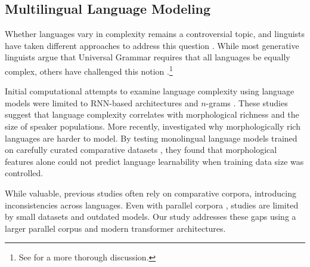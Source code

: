 \subsection{Multilingual Language Modeling}

Whether languages vary in complexity remains a controversial topic, and linguists have taken different approaches to address this question \citep[e.g.,][]{mcwhorter2001worlds,mcwhorter2011linguistic,newmeyer2021complexity,joseph2012all}. While most generative linguists argue that Universal Grammar requires that all languages be equally complex, others have challenged this notion \citep{gil2008complex}.\footnote{See \citet{newmeyer2021complexity} for a more thorough discussion.}

Initial computational attempts to examine language complexity using language models were limited to RNN-based architectures \citep{cotterell-etal-2018-languages,mielke-etal-2019-kind,Johnson2021InvestigatingTE} and $n$-grams \citep{koplenig2023languages}. These studies suggest that language complexity correlates with morphological richness and the size of speaker populations. More recently, \citet{arnett-bergen-2025-language} investigated why morphologically rich languages are harder to model. By testing monolingual language models trained on carefully curated comparative datasets \citep{chang2024goldfishmonolinguallanguagemodels}, they found that morphological features alone could not predict language learnability when training data size was controlled.

While valuable, previous studies often rely on comparative corpora, introducing inconsistencies across languages. Even with parallel corpora \citep{mielke-etal-2019-kind}, studies are limited by small datasets and outdated models. Our study addresses these gaps using a larger parallel corpus and modern transformer architectures.